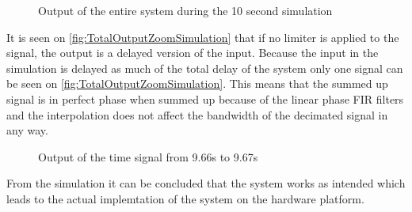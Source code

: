 \begin{figure}[H]
    \centering
    
    \caption{Output of the entire system during the 10 second simulation}
    \label{fig:TotalOutputSimulation}
\end{figure}

It is seen on \autoref{fig:TotalOutputZoomSimulation} that if no limiter is applied to the signal, the output is a delayed version of the input. Because the input in the simulation is delayed as much of the total delay of the system only one signal can be seen on \autoref{fig:TotalOutputZoomSimulation}. This means that the summed up signal is in perfect phase when summed up because of the linear phase FIR filters and the interpolation does not affect the bandwidth of the decimated signal in any way.      

\begin{figure}[H]
    \centering
    
    \caption{Output of the time signal from 9.66s to 9.67s}
    \label{fig:TotalOutputZoomSimulation}
\end{figure}
\vspace*{-5mm}
From the simulation it can be concluded that the system works as intended which leads to the actual implemtation of the system on the hardware platform. 



 




